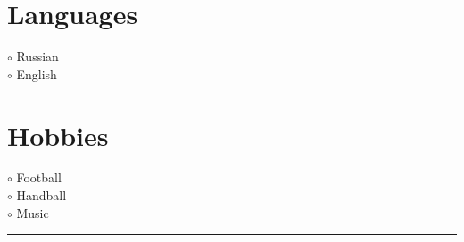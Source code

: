 \documentclass[a4paper,10pt]{article}
\newcommand{\MyVerticalRule}{%
	\textcolor{ColorOne}{\rule{1pt}{\textheight}}
}
\begin{document}
\begin{adjustbox}{valign=t}
\begin{minipage}{0.3\textwidth}
\vfill
\section*{Languages}
\raggedright
\textcolor{ColorOne}{$\circ$} Russian\\
\textcolor{ColorOne}{$\circ$} English

\vfill

\section*{Hobbies}
\raggedright
\textcolor{ColorOne}{$\circ$} Football\\
\textcolor{ColorOne}{$\circ$} Handball\\
\textcolor{ColorOne}{$\circ$} Music

\vfill

\vfill
\end{minipage}
\end{adjustbox}
%
%
%
\hfill
\begin{adjustbox}{valign=t}
\begin{minipage}{0.05\textwidth}
\MyVerticalRule
\end{minipage}
\end{adjustbox}
\hfill
%
\end{document}
